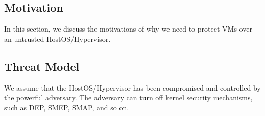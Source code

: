 \subsection{Motivation} \label{sub:motivation}
In this section, we discuss the motivations of why we need to protect VMs over an untrusted HostOS/Hypervisor.

\subsection{Threat Model} \label{sub:thretmodel}
We assume that the HostOS/Hypervisor has been compromised and controlled by the powerful adversary. The adversary can turn off kernel security mechanisms, such as DEP, SMEP, SMAP, and so on. 

